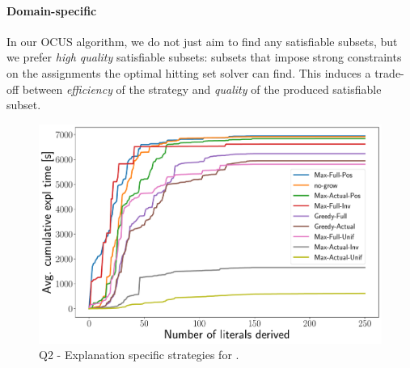 \paragraph{Domain-specific \grow} 
In our OCUS algorithm, we do not just aim to find any satisfiable subsets, but we prefer \emph{high quality} satisfiable subsets: subsets that impose strong constraints on the assignments the optimal hitting set solver can find. 
This induces a trade-off between \emph{efficiency} of the \grow strategy and \emph{quality} of the produced satisfiable subset.

\begin{figure}[t]
  \centering
  \includegraphics[width=0.85\columnwidth]{figures_post_paper/new_cumul_grow_avg_time_lits_derived_new.pdf}
  \caption{Q2 - Explanation specific \grow strategies for \comus.}
  \label{fig:grow_strategies}
\end{figure}


